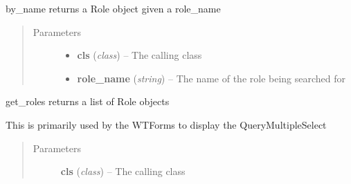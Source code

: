 \documentclass[letterpaper,10pt,english]{sphinxmanual}
\begin{document}
\begin{fulllineitems}

\begin{fulllineitems}
\label{dev-users:cagenix.users.models.Role.by_name}
by\_name returns a Role object given a role\_name
\begin{quote}\begin{description}
\item[{Parameters}] \leavevmode\begin{itemize}
\item {} 
\textbf{cls} (\emph{class}) -- The calling class

\item {} 
\textbf{role\_name} (\emph{string}) -- The name of the role being searched for

\end{itemize}

\end{description}\end{quote}

\end{fulllineitems}


\begin{fulllineitems}
\label{dev-users:cagenix.users.models.Role.get_roles}
get\_roles returns a list of Role objects

This is primarily used by the WTForms to display the QueryMultipleSelect
\begin{quote}\begin{description}
\item[{Parameters}] \leavevmode
\textbf{cls} (\emph{class}) -- The calling class

\end{description}\end{quote}

\end{fulllineitems}


\end{fulllineitems}

\end{document}
